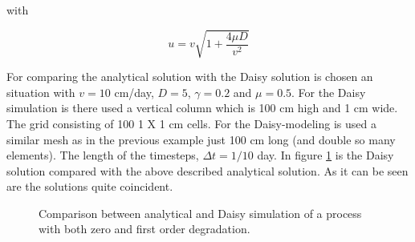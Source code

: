 \documentclass{report}
\begin{document}
with

\begin{equation}
u=v \sqrt{1+\frac{4\mu D}{v^2}}
\end{equation}


For comparing the analytical solution with the Daisy solution is
chosen an situation with $v=10$ cm/day, $D=5$, $\gamma=0.2$
and $\mu=0.5$. For the Daisy simulation is there used a vertical
column which is 100 cm high and 1 cm wide. The grid consisting of
100 1 X 1 cm cells. For the Daisy-modeling is used a similar mesh
as in the previous example just 100 cm long (and double so many
elements). The length of the timesteps, $\Delta t=1/10$ day. In
figure \ref{fig:solanalyt} is the Daisy solution compared with the
above described analytical solution. As it can be seen are the
solutions quite coincident.

\begin{figure}[h!]  %
\begin{center}
\caption{Comparison between analytical and Daisy simulation of a
process with both zero and first order degradation.}
\label{fig:solanalyt}
\end{center}
\end{figure}





%
%



%
%
%




%
%


%


\end{document}
